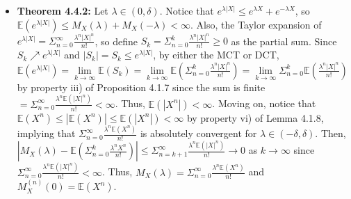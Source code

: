 \documentclass[12pt]{article}
\newcommand{\E}{\mathbb{E}}
\begin{document}
\begin{itemize}
    \item \textbf{Theorem 4.4.2:} Let $\lambda \in (0, \delta)$. Notice that $e^{\lambda |X|} \leq e^{\lambda X} + e^{-\lambda X}$, so $\E(e^{\lambda |X|}) \leq M_X(\lambda) + M_X(-\lambda) < \infty$. Also, the Taylor expansion of $e^{\lambda |X|} = \Sigma_{n=0}^\infty \frac{\lambda^n |X|^n}{n!}$, so define $S_k = \Sigma_{n=0}^k \frac{\lambda^n |X|^n}{n!} \geq 0$ as the partial sum. Since $S_k \nearrow e^{\lambda |X|}$ and $|S_k| = S_k \leq e^{\lambda |X|}$, by either the MCT or DCT, $\E(e^{\lambda |X|}) = \lim \limits_{k \to \infty} \E(S_k) = \lim \limits_{k \to \infty} \E(\Sigma_{n=0}^k \frac{\lambda^n |X|^n}{n!}) = \lim \limits_{k \to \infty} \Sigma_{n=0}^k \E(\frac{\lambda^n |X|^n}{n!})$ by property iii) of Proposition 4.1.7 since the sum is finite $= \Sigma_{n=0}^\infty \frac{\lambda^n \E(|X|^n)}{n!} < \infty$. Thus, $\E(|X^n|) < \infty$. Moving on, notice that $\E(X^n) \leq |\E(X^n)| \leq \E(|X^n|) < \infty$ by property vi) of Lemma 4.1.8, implying that $\Sigma_{n=0}^\infty \frac{\lambda^n \E(X^n)}{n!}$ is absolutely convergent for $\lambda \in (-\delta, \delta)$. Then, $|M_X(\lambda) - \E(\Sigma_{n=0}^k \frac{\lambda^n X^n}{n!})| \leq \Sigma_{n=k+1}^\infty \frac{\lambda^n \E(|X|^n)}{n!} \to 0$ as $k \to \infty$ since $\Sigma_{n=0}^\infty \frac{\lambda^n \E(|X|^n)}{n!} < \infty$. Thus, $M_X(\lambda) = \Sigma_{n=0}^\infty \frac{\lambda^n \E(X^n)}{n!}$ and $M_X^{(n)}(0) = \E(X^n)$.
\end{itemize}
\end{document}
